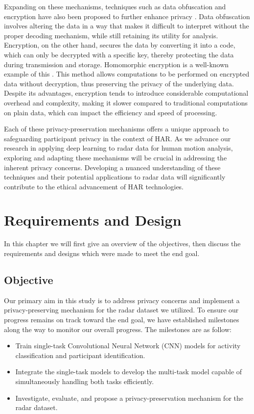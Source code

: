 \documentclass{l4proj}
\begin{document}
Expanding on these mechanisms, techniques such as data obfuscation and encryption have also been proposed to further enhance privacy \cite{a_review_on_visual_privacy_preservation_technique}. Data obfuscation involves altering the data in a way that makes it difficult to interpret without the proper decoding mechanism, while still retaining its utility for analysis. Encryption, on the other hand, secures the data by converting it into a code, which can only be decrypted with a specific key, thereby protecting the data during transmission and storage. Homomorphic encryption is a well-known example of this \citep{crypto-nets_neural_network_over_encrypted_data, homomorphic_encryption_survey}. This method allows computations to be performed on encrypted data without decryption, thus preserving the privacy of the underlying data. Despite its advantages, encryption tends to introduce considerable computational overhead and complexity, making it slower compared to traditional computations on plain data, which can impact the efficiency and speed of processing.

Each of these privacy-preservation mechanisms offers a unique approach to safeguarding participant privacy in the context of HAR. As we advance our research in applying deep learning to radar data for human motion analysis, exploring and adapting these mechanisms will be crucial in addressing the inherent privacy concerns. Developing a nuanced understanding of these techniques and their potential applications to radar data will significantly contribute to the ethical advancement of HAR technologies.

\chapter{Requirements and Design}
In this chapter we will first give an overview of the objectives, then discuss the requirements and designs which were made to meet the end goal.

\section{Objective}
Our primary aim in this study is to address privacy concerns and implement a privacy-preserving mechanism for the radar dataset we utilized. To ensure our progress remains on track toward the end goal, we have established milestones along the way to monitor our overall progress. The milestones are as follow:
\begin{itemize}
    \item Train single-task Convolutional Neural Network (CNN) models for activity classification and participant identification.
    \item Integrate the single-task models to develop the multi-task model capable of simultaneously handling both tasks efficiently.
    \item Investigate, evaluate, and propose a privacy-preservation mechanism for the radar dataset.
\end{itemize}
\end{document}
